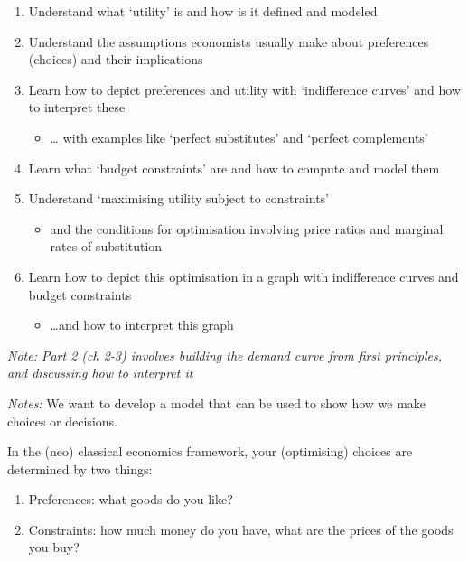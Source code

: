 \documentclass[]{article}
\providecommand{\tightlist}{%
  \setlength{\itemsep}{0pt}\setlength{\parskip}{0pt}}
\begin{document}
\begin{enumerate}
\def\labelenumi{\arabic{enumi}.}
\tightlist
\item
  Understand what `utility' is and how is it defined and modeled
\item
  Understand the assumptions economists usually make about preferences (choices) and their implications
\item
  Learn how to depict preferences and utility with `indifference curves' and how to interpret these

  \begin{itemize}
  \tightlist
  \item
    \ldots{} with examples like `perfect substitutes' and `perfect complements'
  \end{itemize}
\item
  Learn what `budget constraints' are and how to compute and model them
\item
  Understand `maximising utility subject to constraints'

  \begin{itemize}
  \tightlist
  \item
    and the conditions for optimisation involving price ratios and marginal rates of substitution
  \end{itemize}
\item
  Learn how to depict this optimisation in a graph with indifference curves and budget constraints

  \begin{itemize}
  \tightlist
  \item
    \ldots{}and how to interpret this graph
  \end{itemize}
\end{enumerate}

\emph{Note: Part 2 (ch 2-3) involves building the demand curve from first principles, and discussing how to interpret it}

\emph{Notes:}
We want to develop a model that can be used to show how we make choices or decisions.

In the (neo) classical economics framework, your (optimising) choices are determined by two things:

\begin{enumerate}
\def\labelenumi{\arabic{enumi}.}
\item
  Preferences: what goods do you like?
\item
  Constraints: how much money do you have, what are the prices of the goods you buy?
\end{enumerate}
\end{document}

